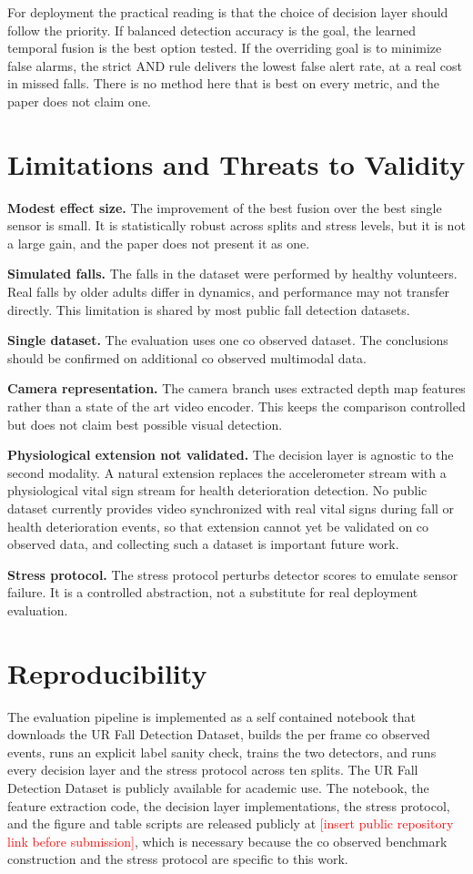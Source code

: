 \documentclass[conference]{IEEEtran}
\begin{document}
For deployment the practical reading is that the choice of decision layer should
follow the priority. If balanced detection accuracy is the goal, the learned
temporal fusion is the best option tested. If the overriding goal is to minimize
false alarms, the strict AND rule delivers the lowest false alert rate, at a real
cost in missed falls. There is no method here that is best on every metric, and
the paper does not claim one.

\section{Limitations and Threats to Validity}
\textbf{Modest effect size.} The improvement of the best fusion over the best
single sensor is small. It is statistically robust across splits and stress
levels, but it is not a large gain, and the paper does not present it as one.

\textbf{Simulated falls.} The falls in the dataset were performed by healthy
volunteers. Real falls by older adults differ in dynamics, and performance may
not transfer directly. This limitation is shared by most public fall detection
datasets.

\textbf{Single dataset.} The evaluation uses one co observed dataset. The
conclusions should be confirmed on additional co observed multimodal data.

\textbf{Camera representation.} The camera branch uses extracted depth map
features rather than a state of the art video encoder. This keeps the comparison
controlled but does not claim best possible visual detection.

\textbf{Physiological extension not validated.} The decision layer is agnostic to
the second modality. A natural extension replaces the accelerometer stream with a
physiological vital sign stream for health deterioration detection. No public
dataset currently provides video synchronized with real vital signs during fall
or health deterioration events, so that extension cannot yet be validated on co
observed data, and collecting such a dataset is important future work.

\textbf{Stress protocol.} The stress protocol perturbs detector scores to emulate
sensor failure. It is a controlled abstraction, not a substitute for real
deployment evaluation.

\section{Reproducibility}
The evaluation pipeline is implemented as a self contained notebook that
downloads the UR Fall Detection Dataset, builds the per frame co observed events,
runs an explicit label sanity check, trains the two detectors, and runs every
decision layer and the stress protocol across ten splits. The UR Fall Detection
Dataset is publicly available for academic use. The notebook, the feature
extraction code, the decision layer implementations, the stress protocol, and the
figure and table scripts are released publicly at
\textcolor{red}{[insert public repository link before submission]}, which is
necessary because the co observed benchmark construction and the stress protocol
are specific to this work.
\end{document}
